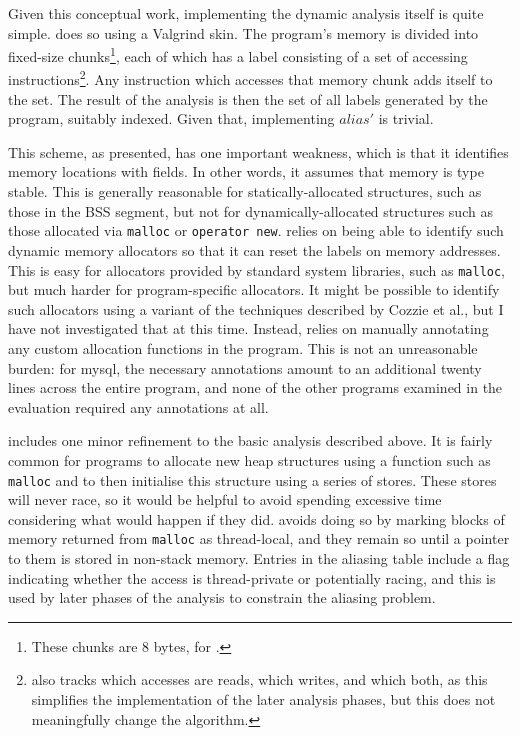 Given this conceptual work, implementing the dynamic analysis itself
is quite simple.  {\Implementation} does so using a Valgrind skin.
The program's memory is divided into fixed-size chunks\footnote{These
  chunks are 8 bytes, for {\implementation}.}, each of which has a
label consisting of a set of accessing
instructions\footnote{{\Implementation} also tracks which accesses are
  reads, which writes, and which both, as this simplifies the
  implementation of the later analysis phases, but this does not
  meaningfully change the algorithm.}.  Any instruction which accesses
that memory chunk adds itself to the set.  The result of the analysis
is then the set of all labels generated by the program, suitably
indexed.  Given that, implementing $\mathit{alias}'$ is trivial.

This scheme, as presented, has one important weakness, which is that
it identifies memory locations with fields.  In other words, it
assumes that memory is type stable\cite{Greenwald1996}.  This is
generally reasonable for statically-allocated structures, such as
those in the BSS segment\cite[Section~7.6]{Stevens}, but not for
dynamically-allocated structures such as those allocated via
\texttt{malloc} or \texttt{operator new}.  {\Implementation} relies on being able to identify
such dynamic memory allocators so that it can reset the labels on
memory addresses.  This is easy for allocators provided by standard
system libraries, such as \texttt{malloc}, but much harder for
program-specific allocators.  It might be possible to identify such
allocators using a variant of the techniques described by Cozzie et
al.\cite{Cozzie2008}, but I have not investigated that at this time.
Instead, {\implementation} relies on manually annotating any custom
allocation functions in the program.  This is not an unreasonable
burden: for mysql, the necessary annotations amount to an additional
twenty lines across the entire program, and none of the other programs
examined in the evaluation required any annotations at all.

{\Implementation} includes one minor refinement to the basic analysis
described above.  It is fairly common for programs to allocate new
heap structures using a function such as \texttt{malloc} and to then
initialise this structure using a series of stores.  These stores will
never race, so it would be helpful to avoid spending excessive time
considering what would happen if they did.  {\Technique} avoids doing
so by marking blocks of memory returned from \texttt{malloc} as
thread-local, and they remain so until a pointer to them is stored in
non-stack memory.  Entries in the aliasing table include a flag
indicating whether the access is thread-private or potentially racing,
and this is used by later phases of the analysis to constrain the
aliasing problem.


